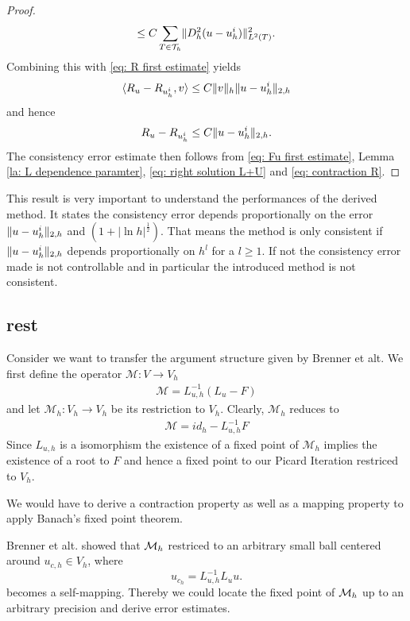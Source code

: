 \begin{proof}
\begin{align}
	\leq C \sum_{T \in \mathcal{T}_h} \lVert D_h^2 (u-u_h^i) \rVert_{L^2(T)}^2.
	\end{align}
	Combining this with \eqref{eq: R first estimate} yields
	\begin{align*}
	 \langle R_u - R_{u^i_h}, v \rangle \leq C \lVert v \rVert_{h} \lVert u-u_h^i \rVert_{2,h}
	\end{align*}
	and hence 
	\begin{align}
	{R_u - R_{u^i_h}} \leq C \lVert u-u_h^i \rVert_{2,h}. \label{eq: contraction R}
	\end{align}
	The consistency error estimate then follows from \eqref{eq: Fu first estimate}, Lemma \ref{la: L dependence paramter}, \eqref{eq: right solution L+U} and \eqref{eq: contraction R}.
\end{proof}

This result is very important to understand the performances of the derived method. It states the consistency error depends proportionally on the error $\lVert u-u^i_h \rVert_{2,h}$ and $(1+|\ln h|^{\frac 1 2})$. That means the method is only consistent if $\lVert u-u^i_h \rVert_{2,h}$ depends proportionally on $h^l$ for a $l \geq 1$. If not the consistency error made is not controllable and in particular the introduced method is not consistent.

\subsection{rest}
Consider we want to transfer the argument structure given by Brenner et alt. We first define the operator $\mathcal M: V \rightarrow V_h$
\begin{align}
	\mathcal M = L_{u,h}^{-1}(L_{u} - F)
\end{align}
and let $\mathcal M_h:V_h \rightarrow V_h$ be its restriction to $V_h$. Clearly, $\mathcal M_h$ reduces to 
\begin{align}
\mathcal M = id_h - L_{u,h}^{-1}F
\end{align}
Since $L_{u,h}$ is a isomorphism the existence of a fixed point of $\mathcal M_h$ implies the existence of a root to $F$ and hence a fixed point to our Picard Iteration restriced to $V_h$.

We would have to derive a contraction property as well as a mapping property to apply Banach's fixed point theorem.

Brenner et alt. showed that $\mathcal M_h$ restriced to an arbitrary small ball centered around $u_{c,h}\in V_h$, where
\[
u_{c_h} = L_{u,h}^{-1} L_u u.
\]
becomes a self-mapping. Thereby we could locate the fixed point of $\mathcal M_h$ up to an arbitrary precision and derive error estimates.

